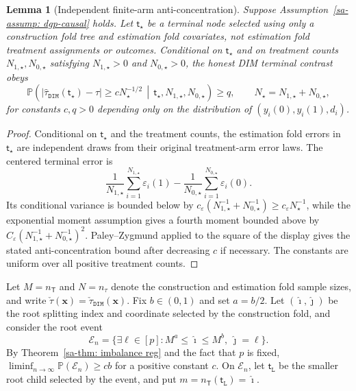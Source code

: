 \documentclass[10pt]{article}
\def\treeT{\mathsf{T}}
\def\nodet{\mathsf{t}}
\def\bx{\mathbf{x}}
\def\P{\mathbb{P}}
\newtheorem{lemma}[theorem]{Lemma}
\theoremstyle{definition}
\theoremstyle{remark}
\begin{document}
\begin{lemma}[Independent finite-arm anti-concentration]\label{sa-lem:honest-finite-arm-anti-concentration}
Suppose Assumption~\ref{sa-assump: dgp-causal} holds. Let $\nodet_\star$ be a terminal node selected using only a construction fold tree and estimation fold covariates, not estimation fold treatment assignments or outcomes. Conditional on $\nodet_\star$ and on treatment counts $N_{1,\star},N_{0,\star}$ satisfying $N_{1,\star}>0$ and $N_{0,\star}>0$, the honest DIM terminal contrast obeys
\[
    \mathbb P\!\left(
        |\hat\tau_{\mathtt{DIM}}(\nodet_\star)-\tau|
        \geq c N_\star^{-1/2}
        \,\middle|\,
        \nodet_\star,N_{1,\star},N_{0,\star}
    \right)
    \geq q,
    \qquad
    N_\star=N_{1,\star}+N_{0,\star},
\]
for constants $c,q>0$ depending only on the distribution of $(y_i(0),y_i(1),d_i)$.
\end{lemma}

\begin{proof}
Conditional on $\nodet_\star$ and the treatment counts, the estimation fold errors in $\nodet_\star$ are independent draws from their original treatment-arm error laws. The centered terminal error is
\[
    \frac{1}{N_{1,\star}}\sum_{i=1}^{N_{1,\star}}\varepsilon_i(1)
    -
    \frac{1}{N_{0,\star}}\sum_{i=1}^{N_{0,\star}}\varepsilon_i(0).
\]
Its conditional variance is bounded below by
$c_\varepsilon(N_{1,\star}^{-1}+N_{0,\star}^{-1})\geq c_\varepsilon N_\star^{-1}$, while the exponential moment assumption gives a fourth moment bounded above by
$C_\varepsilon(N_{1,\star}^{-1}+N_{0,\star}^{-1})^2$. Paley--Zygmund applied to the square of the display gives the stated anti-concentration bound after decreasing $c$ if necessary. The constants are uniform over all positive treatment counts.
\end{proof}

Let $M=n_{\treeT}$ and $N=n_{\tau}$ denote the construction and estimation fold sample sizes, and write $\check{\tau}(\bx)=\check\tau_{\mathtt{DIM}}(\bx)$. Fix $b\in(0,1)$ and set $a=b/2$. Let $(\hat{\imath},\hat{\jmath})$ be the root splitting index and coordinate selected by the construction fold, and consider the root event
\[
    \mathcal E_n
    =
    \{\exists \ell\in[p]: M^a\leq\hat{\imath}\leq M^b,\ \hat{\jmath}=\ell\}.
\]
By Theorem~\ref{sa-thm: imbalance reg} and the fact that $p$ is fixed, $\liminf_{n\to\infty}\P(\mathcal E_n)\geq c b$ for a positive constant $c$. On $\mathcal E_n$, let $\nodet_{\mathtt L}$ be the smaller root child selected by the event, and put $m=n_{\treeT}(\nodet_{\mathtt L})=\hat{\imath}$.
\end{document}
